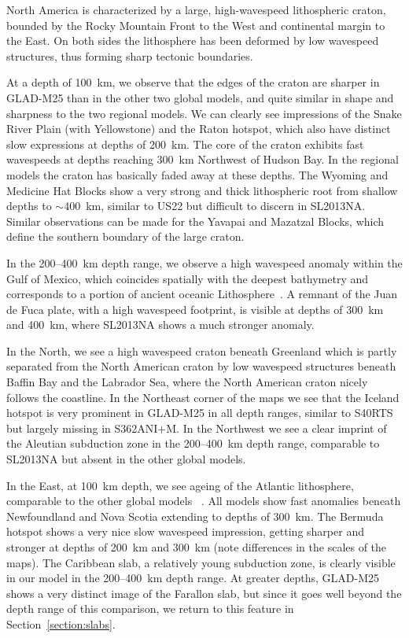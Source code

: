 \documentclass[extra,mreferee]{gji}
\begin{document}
North America is characterized by a large, high-wavespeed lithospheric craton,
bounded by the Rocky Mountain Front to the West and continental
margin to the East. On both sides the lithosphere has been deformed by
low wavespeed structures, thus forming sharp tectonic boundaries.

At a depth of 100~km, we observe that the edges of the craton are sharper in
GLAD-M25 than in the other two global models,
and quite similar in shape and sharpness to the two regional models.
We can clearly see impressions of the Snake River Plain (with Yellowstone)
and the Raton hotspot, which also have distinct slow expressions at depths of 200~km.
The core of the craton exhibits fast wavespeeds at depths reaching 300~km Northwest of
Hudson Bay.
In the regional models the craton has basically faded away at these depths.
The Wyoming and Medicine Hat Blocks show a very strong and thick lithospheric
root from shallow depths to $\sim$400~km, similar to US22 but
difficult to discern in SL2013NA.
Similar observations can be made for the Yavapai and
Mazatzal Blocks, which define the southern boundary of the large craton.

In the 200--400~km depth range, we observe a high wavespeed
anomaly within the Gulf of Mexico, which coincides spatially with the deepest
bathymetry and corresponds to a portion of ancient oceanic
Lithosphere~\citep{muller2008}.
A remnant of the Juan de Fuca plate,
with a high wavespeed footprint, is visible at depths of 300~km and 400~km,
where SL2013NA shows a much stronger anomaly.

In the North, we see a high wavespeed craton beneath Greenland which is partly
separated from the North American craton by low wavespeed structures beneath
Baffin Bay and the Labrador Sea, where the North American craton nicely follows
the coastline.
In the Northeast corner of the maps we see that the Iceland hotspot is very
prominent in GLAD-M25 in all depth ranges, similar to S40RTS but largely missing
in S362ANI$+$M. In the Northwest we see a clear imprint of the Aleutian
subduction zone in the 200--400~km depth range, comparable to SL2013NA but absent
in the other global models.

In the East, at 100~km depth,
we see ageing of the Atlantic lithosphere, comparable to the other global models
~\citep{muller2008, schaeffer2014imaging}.
All models show fast anomalies beneath Newfoundland and Nova Scotia extending to
depths of 300~km. The Bermuda hotspot shows a very nice slow wavespeed impression,
getting sharper and stronger at depths of 200~km and 300~km (note differences in
the scales of the maps).
The Caribbean slab, a relatively young subduction zone, is clearly
visible in our model in the 200--400~km depth range.
At greater depths,
GLAD-M25 shows a very distinct image of the Farallon slab,
but since it goes well beyond the depth range of this comparison,
we return to this feature in Section~\ref{section:slabs}.
\end{document}
